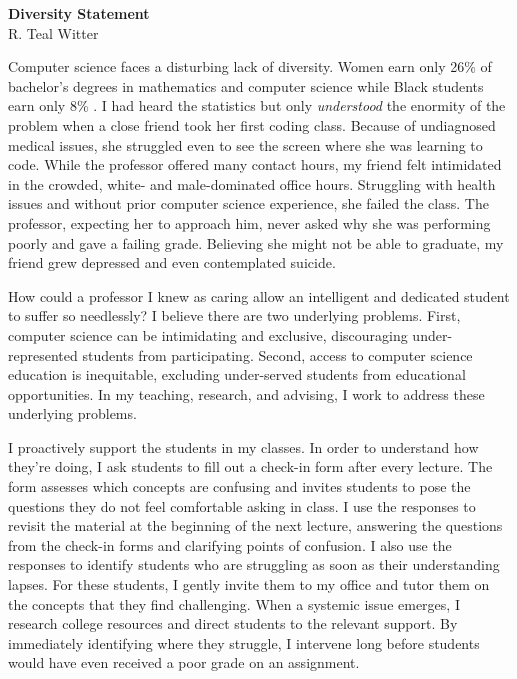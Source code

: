 \documentclass[11pt]{article}
\begin{document}
\begin{center}
	\Large \textbf{Diversity Statement} \\
	\vspace{.25em}
	\large{R. {\color{teal}Teal} Witter}
\end{center}

Computer science faces a disturbing lack of diversity. Women earn only 26\% of bachelor's degrees in mathematics and computer science while Black students earn only 8\% \cite{national2023diversity}. I had heard the statistics but only \textit{understood} the enormity of the problem when a close friend took her first coding class. Because of undiagnosed medical issues, she struggled even to see the screen where she was learning to code. While the professor offered many contact hours, my friend felt intimidated in the crowded, white- and male-dominated office hours. Struggling with health issues and without prior computer science experience, she failed the class. The professor, expecting her to approach him, never asked why she was performing poorly and gave a failing grade. Believing she might not be able to graduate, my friend grew depressed and even contemplated suicide.

How could a professor I knew as caring allow an intelligent and dedicated student to suffer so needlessly? I believe there are two underlying problems. First, computer science can be intimidating and exclusive, discouraging under-represented students from participating. Second, access to computer science education is inequitable, excluding under-served students from educational opportunities. In my teaching, research, and advising, I work to address these underlying problems.

I proactively support the students in my classes.  In order to understand how they're doing, I ask students to fill out a check-in form after every lecture.  The form assesses which concepts are confusing and invites students to pose the questions they do not feel comfortable asking in class.  I use the responses to revisit the material at the beginning of the next lecture, answering the questions from the check-in forms and clarifying points of confusion.  I also use the responses to identify students who are struggling as soon as their understanding lapses.  For these students, I gently invite them to my office and tutor them on the concepts that they find challenging.  When a systemic issue emerges, I research college resources and direct students to the relevant support.  By immediately identifying where they struggle, I intervene long before students would have even received a poor grade on an assignment.
\end{document}
